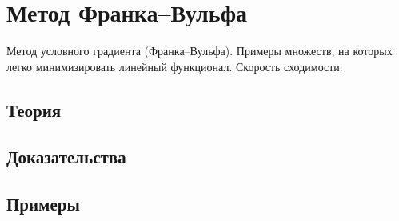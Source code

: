 
\section{Метод Франка–Вульфа}
\label{sec:2.4.14-frank-wolfe}

\begin{ticket}
Метод условного градиента (Франка–Вульфа). Примеры множеств, на которых легко минимизировать линейный функционал. Скорость сходимости.
\end{ticket}

\subsection*{Теория}

\subsection*{Доказательства}

\subsection*{Примеры}
